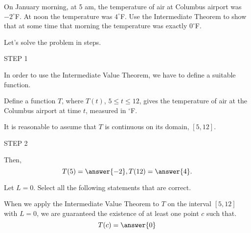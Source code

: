 \documentclass{ximera}
\author{Nela Lakos }
\begin{document}
\begin{exercise}
On January morning,  at 5 am, the temperature of air at Columbus airport  was $-2^{\circ}$F.
At noon the temperature was $4^{\circ}$F.
Use the Intermediate Theorem to show that at some time that morning the temperature was  exactly $0^{\circ}$F.


Let's solve the problem in steps.

STEP 1

In order to use the Intermediate Value Theorem, we have to define a  suitable function.

Define a function $T$, where $T(t)$,  $5\le t\le 12$, gives the temperature of air at the Columbus airport at  time $t$, measured in $^{\circ}$F.

It is reasonable to assume that $T$ is continuous on its domain, $[5,12]$.

STEP 2

\begin{exercise}

Then,
\[
T(5)=\answer{-2},
T(12)=\answer{4}.
\]

\end{exercise}
\begin{exercise}
 Let $L=0$. Select all the following statements that are correct.

\begin{selectAll}
\end{selectAll}

\end{exercise}
When we apply the Intermediate Value Theorem to $T$ on the interval $\left[5,12\right]$ with $L=0$, we are guaranteed the existence of at least one point $c$ such that.
\[
T(c)=\answer{0}
\]
\end{exercise}
\end{document}
